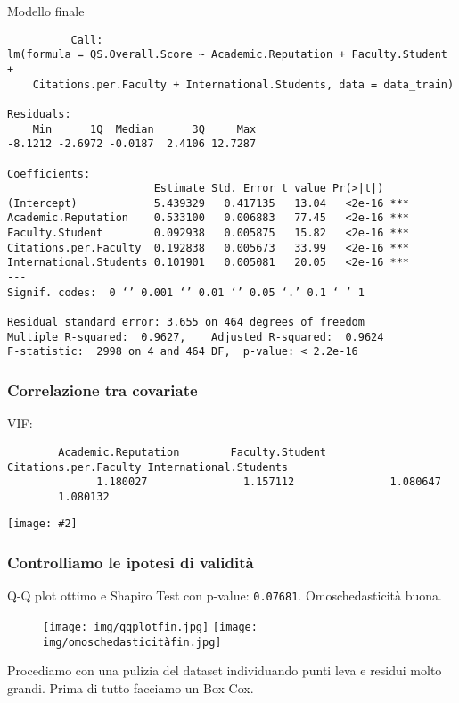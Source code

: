 \documentclass{beamer}
\newcommand{\fg}[2]{%
  \begin{center}
      \texttt{[image: \#2]}%
  \end{center}
}
\begin{document}
\begin{frame}[fragile]
    Modello finale
	{\tiny
    \begin{verbatim}
		  Call:
lm(formula = QS.Overall.Score ~ Academic.Reputation + Faculty.Student + 
    Citations.per.Faculty + International.Students, data = data_train)

Residuals:
    Min      1Q  Median      3Q     Max 
-8.1212 -2.6972 -0.0187  2.4106 12.7287 

Coefficients:
                       Estimate Std. Error t value Pr(>|t|)    
(Intercept)            5.439329   0.417135   13.04   <2e-16 ***
Academic.Reputation    0.533100   0.006883   77.45   <2e-16 ***
Faculty.Student        0.092938   0.005875   15.82   <2e-16 ***
Citations.per.Faculty  0.192838   0.005673   33.99   <2e-16 ***
International.Students 0.101901   0.005081   20.05   <2e-16 ***
---
Signif. codes:  0 ‘’ 0.001 ‘’ 0.01 ‘’ 0.05 ‘.’ 0.1 ‘ ’ 1

Residual standard error: 3.655 on 464 degrees of freedom
Multiple R-squared:  0.9627,	Adjusted R-squared:  0.9624 
F-statistic:  2998 on 4 and 464 DF,  p-value: < 2.2e-16
    \end{verbatim}
    }
\end{frame}

\begin{frame}[fragile]
\frametitle{Correlazione tra covariate}
    VIF:
    {\tiny
    \begin{verbatim}
        Academic.Reputation        Faculty.Student  Citations.per.Faculty International.Students 
              1.180027               1.157112               1.080647               1.080132
    \end{verbatim}
    }
	\fg{0.4}{corr.jpg}
\end{frame}

\begin{frame}
\frametitle{Controlliamo le ipotesi di validità}
    Q-Q plot ottimo e Shapiro Test con p-value: \texttt{0.07681}. Omoschedasticità buona.
    \begin{figure}
	   \texttt{[image: img/qqplotfin.jpg]}
	   \hfill
	   \texttt{[image: img/omoschedasticitàfin.jpg]}
	\end{figure}
\end{frame}

\begin{frame}
    Procediamo con una pulizia del dataset individuando punti leva e residui molto grandi.
    Prima di tutto facciamo un Box Cox.
\end{frame}
\end{document}
